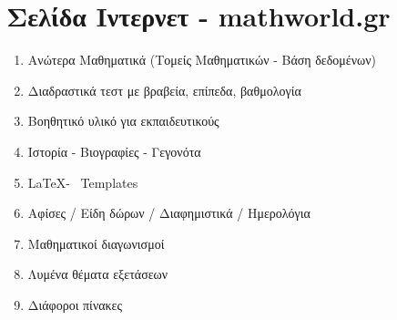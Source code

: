 \documentclass[11pt,a4paper]{book}
\begin{document}
\section{Σελίδα Ιντερνετ - mathworld.gr}
\begin{enumerate}[label=\arabic*]
\item Ανώτερα Μαθηματικά (Τομείς Μαθηματικών - Βάση δεδομένων)
\item Διαδραστικά τεστ με βραβεία, επίπεδα, βαθμολογία
\item Βοηθητικό υλικό για εκπαιδευτικούς
\item Ιστορία - Βιογραφίες - Γεγονότα
\item \LaTeX - \XeLaTeX \ Templates
\item Αφίσες / Είδη δώρων / Διαφημιστικά / Ημερολόγια
\item Μαθηματικοί διαγωνισμοί
\item Λυμένα θέματα εξετάσεων
\item Διάφοροι πίνακες
\end{enumerate}
\end{document}
